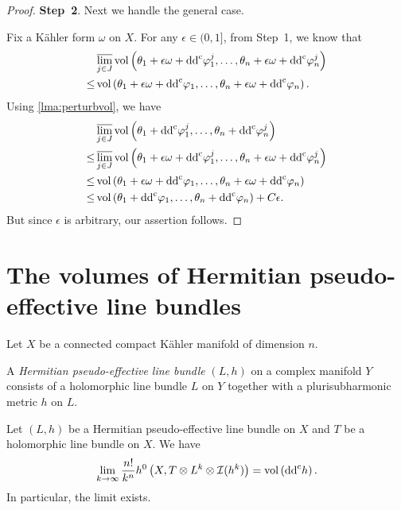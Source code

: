 \begin{proof}
    \textbf{Step~2}. Next we handle the general case.

    Fix a Kähler form $\omega$ on $X$. For any $\epsilon\in (0,1]$, from Step~1, we know that
    \[
    \begin{split}
   &\varlimsup_{j\in J} \operatorname{vol} \left(\theta_1+\epsilon\omega+\mathrm{dd}^{\mathrm{c}} \varphi_1^j, \dots,\theta_n+\epsilon\omega+\mathrm{dd}^{\mathrm{c}} \varphi_n^j \right) \\
   \leq & \operatorname{vol}\left(\theta_1+\epsilon\omega+\mathrm{dd}^{\mathrm{c}} \varphi_1, \dots,\theta_n+\epsilon\omega+\mathrm{dd}^{\mathrm{c}} \varphi_n\right).
   \end{split}
   \]
   Using \cref{lma:perturbvol}, we have
   \[
   \begin{aligned}
     &\varlimsup_{j\in J} \operatorname{vol} \left(\theta_1+\mathrm{dd}^{\mathrm{c}} \varphi_1^j, \dots,\theta_n+\mathrm{dd}^{\mathrm{c}} \varphi_n^j \right)\\
     \leq & \varlimsup_{j\in J} \operatorname{vol} \left(\theta_1+\epsilon\omega+\mathrm{dd}^{\mathrm{c}} \varphi_1^j, \dots,\theta_n+\epsilon\omega+\mathrm{dd}^{\mathrm{c}} \varphi_n^j \right)\\
     \leq &\operatorname{vol}\left(\theta_1+\epsilon\omega+\mathrm{dd}^{\mathrm{c}} \varphi_1, \dots,\theta_n+\epsilon\omega+\mathrm{dd}^{\mathrm{c}} \varphi_n\right)\\
     \leq &\operatorname{vol}\left(\theta_1+\mathrm{dd}^{\mathrm{c}} \varphi_1, \dots,\theta_n+\mathrm{dd}^{\mathrm{c}} \varphi_n\right)+C\epsilon.
    \end{aligned}
   \]
   But since $\epsilon$ is arbitrary, our assertion follows.
\end{proof}

\section{The volumes of Hermitian pseudo-effective line bundles}\label{sec:volHermitianbig}
Let $X$ be a connected compact Kähler manifold of dimension $n$.



\begin{definition}\label{def:Hermpsef}
    A \emph{Hermitian pseudo-effective line bundle} $(L,h)$ on a complex manifold $Y$ consists of a holomorphic line bundle $L$ on $Y$ together with a plurisubharmonic metric $h$ on $L$.
\end{definition}



\begin{theorem}\label{thm:DXmain1}
    Let $(L,h)$ be a Hermitian pseudo-effective line bundle on $X$ and $T$ be a holomorphic line bundle on $X$.
    We have
    \begin{equation}\label{eq:DXmain1}
        \lim_{k\to\infty}\frac{n!}{k^n}h^0\left(X,T\otimes L^k\otimes \mathcal{I}(h^k)\right)=\operatorname{vol} \left(\mathrm{dd}^{\mathrm{c}} h\right).
    \end{equation}
    In particular, the limit exists.
\end{theorem}

